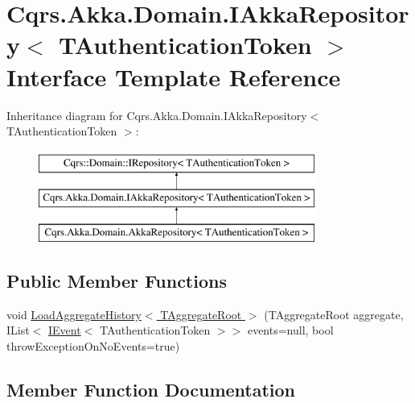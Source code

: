 \hypertarget{interfaceCqrs_1_1Akka_1_1Domain_1_1IAkkaRepository}{}\section{Cqrs.\+Akka.\+Domain.\+I\+Akka\+Repository$<$ T\+Authentication\+Token $>$ Interface Template Reference}
\label{interfaceCqrs_1_1Akka_1_1Domain_1_1IAkkaRepository}
Inheritance diagram for Cqrs.\+Akka.\+Domain.\+I\+Akka\+Repository$<$ T\+Authentication\+Token $>$\+:\begin{figure}[H]
\begin{center}
\leavevmode
\includegraphics[height=3.000000cm]{interfaceCqrs_1_1Akka_1_1Domain_1_1IAkkaRepository}
\end{center}
\end{figure}
\subsection*{Public Member Functions}
\begin{DoxyCompactItemize}
\item 
void \hyperlink{interfaceCqrs_1_1Akka_1_1Domain_1_1IAkkaRepository_a6bb695a0f1bf3860636c8d6537b3272c_a6bb695a0f1bf3860636c8d6537b3272c}{Load\+Aggregate\+History$<$ T\+Aggregate\+Root $>$} (T\+Aggregate\+Root aggregate, I\+List$<$ \hyperlink{interfaceCqrs_1_1Events_1_1IEvent}{I\+Event}$<$ T\+Authentication\+Token $>$$>$ events=null, bool throw\+Exception\+On\+No\+Events=true)
\end{DoxyCompactItemize}


\subsection{Member Function Documentation}
\mbox{\label{interfaceCqrs_1_1Akka_1_1Domain_1_1IAkkaRepository_a6bb695a0f1bf3860636c8d6537b3272c_a6bb695a0f1bf3860636c8d6537b3272c}} 

